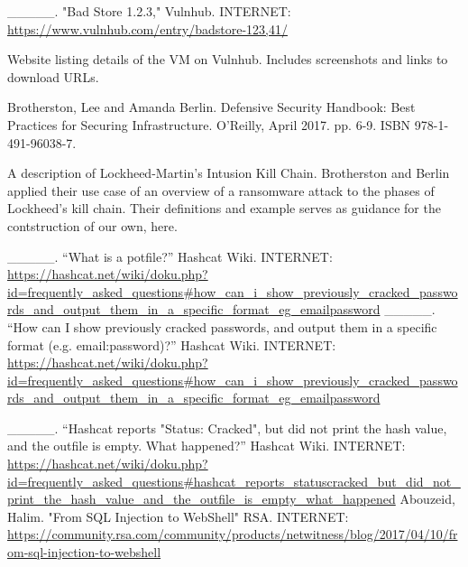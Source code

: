 \endnote{[4]}  \_\_\_\_\_.  "Bad Store 1.2.3," Vulnhub.  INTERNET:  \url{https://www.vulnhub.com/entry/badstore-123,41/} 

Website listing details of the VM on Vulnhub.  Includes screenshots and links to download URLs.

\endnote{[5]}  Brotherston, Lee and Amanda Berlin.  Defensive Security Handbook:  Best Practices for Securing Infrastructure.  O'Reilly, April 2017. pp. 6-9. ISBN 978-1-491-96038-7. 

A description of Lockheed-Martin's Intusion Kill Chain.  Brotherston and Berlin applied their use case of an overview of a ransomware attack to the phases of Lockheed's kill chain.  Their definitions and example serves as guidance for the contstruction of our own, here.

\endnote{[6]} \_\_\_\_\_. ``What is a potfile?'' Hashcat Wiki. INTERNET: \url{https://hashcat.net/wiki/doku.php?id=frequently_asked_questions\#how_can_i_show_previously_cracked_passwords_and_output_them_in_a_specific_format_eg_emailpassword} 
\endnote{[7]} \_\_\_\_\_. ``How can I show previously cracked passwords, and output them in a specific format (e.g. email:\gls{password})?'' Hashcat Wiki. INTERNET: \url{https://hashcat.net/wiki/doku.php?id=frequently_asked_questions\#how_can_i_show_previously_cracked_passwords_and_output_them_in_a_specific_format_eg_emailpassword} 

\endnote{[8]} \_\_\_\_\_. ``Hashcat reports "Status: Cracked", but did not print the hash value, and the outfile is empty. What happened?'' Hashcat Wiki. INTERNET: \url{https://hashcat.net/wiki/doku.php?id=frequently_asked_questions\#hashcat_reports_statuscracked_but_did_not_print_the_hash_value_and_the_outfile_is_empty_what_happened} 
\endnote{[9]} Abouzeid, Halim.  "From SQL Injection to WebShell"  RSA.  INTERNET:  \url{https://community.rsa.com/community/products/netwitness/blog/2017/04/10/from-sql-injection-to-webshell}

